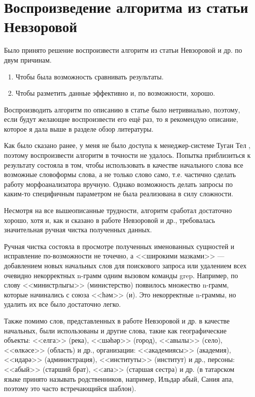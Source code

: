 \section{Воспроизведение алгоритма из статьи Невзоровой}

Было принято решение воспроизвести алгоритм из статьи Невзоровой и др. \cite{Nevzorova} по двум причинам.

\begin{enumerate}
\item Чтобы была возможность сравнивать результаты.
\item Чтобы разметить данные эффективно и, по возможности, хорошо.
\end{enumerate}


Воспроизводить алгоритм по описанию в статье было нетривиально, поэтому, если будут желающие воспроизвести его ещё раз, то я рекомендую описание, которое я дала выше в разделе обзор литературы.

Как было сказано ранее, у меня не было доступа к менеджер-системе Туган Тел \cite{tugan_tel}, поэтому воспроизвести алгоритм в точности не удалось. Попытка приблизиться к результату состояла в том, чтобы использовать в качестве начального слова все возможные словоформы слова, а не только слово само, т.е. частично сделать работу морфоанализатора вручную. Однако возможность делать запросы по каким-то специфичным параметром не была реализована в силу сложности.

Несмотря на все вышеописанные трудности, алгоритм сработал достаточно хорошо, хотя и, как и сказано в работе Невзоровой и др., требовалась значительная ручная чистка полученных данных.

Ручная чистка состояла в просмотре полученных именованных сущностей и исправление по-возможности  не точечно, а <<широкими мазками>> --- добавлением новых начальных слов для поискового запроса или удалением всех очевидно некорректных n-грамм одним вызовом команды grep. Например, по слову <<министрлыгы>> (министерство) появилось множество n-грамм, которые начинались с союза <<һәм>> (и). Это некорректные n-граммы, но удалить их все было достаточно легко. 

Также помимо слов, представленных в работе Невзоровой и др. в качестве начальных, были использованы и другие слова, такие как географические объекты: <<елга>> (река), <<шәһәр>> (город), <<авылы>> (село), <<өлкәсе>> (область) и др., организации:  <<академиясы>> (академия), <<идарә>> (администрация), <<институты>> (институт) и др., персоны: <<абый>> (старший брат), <<апа>> (старшая сестра) и др. (в татарском языке принято называть родственников, например, Ильдар абый, Сания апа, поэтому это часто встречающийся шаблон).

